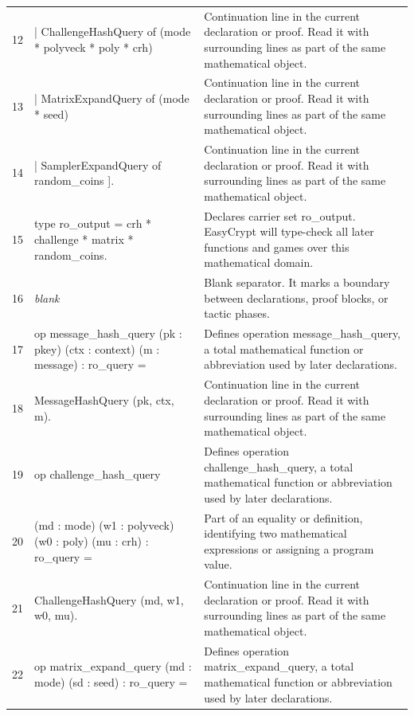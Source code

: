 \documentclass[10pt]{article}
\begin{document}
\begin{longtable}{r L{0.53\textwidth} L{0.37\textwidth}}
12 & {\ttfamily\scriptsize   | ChallengeHashQuery of (mode * polyveck * poly * crh)} & Continuation line in the current declaration or proof.  Read it with surrounding lines as part of the same mathematical object. \\
13 & {\ttfamily\scriptsize   | MatrixExpandQuery of (mode * seed)} & Continuation line in the current declaration or proof.  Read it with surrounding lines as part of the same mathematical object. \\
14 & {\ttfamily\scriptsize   | SamplerExpandQuery of random\_coins ].} & Continuation line in the current declaration or proof.  Read it with surrounding lines as part of the same mathematical object. \\
15 & {\ttfamily\scriptsize type ro\_output = crh * challenge * matrix * random\_coins.} & Declares carrier set ro\_output.  EasyCrypt will type-check all later functions and games over this mathematical domain. \\
16 & {\ttfamily\scriptsize \emph{blank}} & Blank separator.  It marks a boundary between declarations, proof blocks, or tactic phases. \\
17 & {\ttfamily\scriptsize op message\_hash\_query (pk : pkey) (ctx : context) (m : message) : ro\_query =} & Defines operation message\_hash\_query, a total mathematical function or abbreviation used by later declarations. \\
18 & {\ttfamily\scriptsize   MessageHashQuery (pk, ctx, m).} & Continuation line in the current declaration or proof.  Read it with surrounding lines as part of the same mathematical object. \\
19 & {\ttfamily\scriptsize op challenge\_hash\_query} & Defines operation challenge\_hash\_query, a total mathematical function or abbreviation used by later declarations. \\
20 & {\ttfamily\scriptsize    (md : mode) (w1 : polyveck) (w0 : poly) (mu : crh) : ro\_query =} & Part of an equality or definition, identifying two mathematical expressions or assigning a program value. \\
21 & {\ttfamily\scriptsize   ChallengeHashQuery (md, w1, w0, mu).} & Continuation line in the current declaration or proof.  Read it with surrounding lines as part of the same mathematical object. \\
22 & {\ttfamily\scriptsize op matrix\_expand\_query (md : mode) (sd : seed) : ro\_query =} & Defines operation matrix\_expand\_query, a total mathematical function or abbreviation used by later declarations. \\

\end{longtable}
\end{document}

